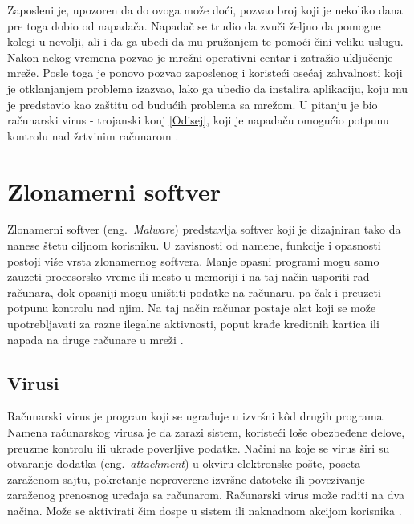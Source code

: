 \documentclass[a4paper]{article}
\begin{document}
Zaposleni je, upozoren da do ovoga može doći, pozvao broj koji je nekoliko dana pre toga dobio od napadača. Napadač se trudio da zvuči željno da pomogne kolegi u nevolji, ali i da ga ubedi da mu pružanjem te pomoći čini veliku uslugu. Nakon nekog vremena pozvao je mrežni operativni centar i zatražio uključenje mreže. Posle toga je ponovo pozvao zaposlenog i koristeći osećaj zahvalnosti koji je otklanjanjem problema izazvao, lako ga ubedio da instalira aplikaciju, koju mu je predstavio kao zaštitu od budućih problema sa mrežom. U pitanju je bio računarski virus - trojanski konj \ref{Odisej}, koji je napadaču omogućio potpunu kontrolu nad žrtvinim računarom \cite{deception}.

\section{Zlonamerni softver}
\label{sec:malware}

Zlonamerni softver (eng.~{\em Malware}) predstavlja softver koji je dizajniran tako da nanese štetu ciljnom korisniku. U zavisnosti od namene, funkcije i opasnosti postoji više vrsta zlonamernog softvera. Manje opasni programi mogu samo zauzeti procesorsko vreme ili mesto u memoriji i na taj način usporiti rad računara, dok opasniji mogu uništiti podatke na računaru, pa čak i preuzeti potpunu kontrolu nad njim. Na taj način računar postaje alat koji se može upotrebljavati za razne ilegalne aktivnosti, poput krađe kreditnih kartica ili napada na druge računare u mreži \cite{ethics}.


\subsection{Virusi}

Računarski virus je program koji se ugrađuje u izvršni kôd drugih programa. Namena računarskog virusa je da zarazi sistem, koristeći loše obezbeđene delove, preuzme kontrolu ili ukrade poverljive podatke. Načini na koje se virus širi su otvaranje dodatka (eng.~{\em attachment}) u okviru elektronske pošte, poseta zaraženom sajtu, pokretanje neproverene izvršne datoteke ili povezivanje zaraženog prenosnog uređaja sa računarom. Računarski virus može raditi na dva načina. Može se aktivirati čim dospe u sistem ili naknadnom akcijom korisnika \cite{viruses_and_worms,computer_virus}.
\end{document}
